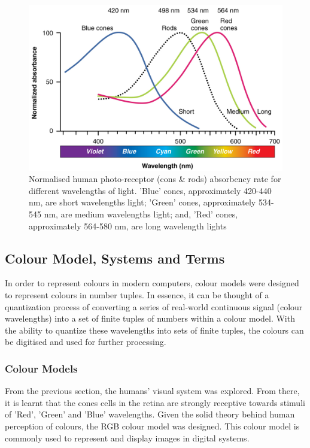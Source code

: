\begin{figure}[hbt!]\centering
\includegraphics[width=.7\textwidth]{image/lit/ColorSensitivity.jpg}
\caption[Normalised human photo-receptor absorbency rate for different wavelength lights]{Normalised human photo-receptor (cons \& rods) absorbency rate for different wavelengths of light. 'Blue' cones, approximately 420-440 nm, are short wavelengths light; 'Green' cones, approximately 534-545 nm, are medium wavelengths light; and, 'Red' cones, approximately 564-580 nm, are long wavelength lights }
\label{fig:visibleSpectrum}
\end{figure}




\subsection{Colour Model, Systems and Terms}
\label{section:colourterm}

In order to represent colours in modern computers, colour models were designed to represent colours in number tuples. In essence, it can be thought of a quantization process of converting a series of real-world continuous signal (colour wavelengths) into a set of finite tuples of numbers within a colour model.
With the ability to quantize these wavelengths into sets of finite tuples, the colours can be digitised and used for further processing.


\subsubsection{Colour Models}
From the previous section, the humans' visual system was explored. From there, it is learnt that the cones cells in the retina are strongly receptive towards stimuli of 'Red', 'Green' and 'Blue' wavelengths. Given the solid theory behind human perception of colours, the RGB colour model was designed. This colour model is commonly used to represent and display images in digital systems.

